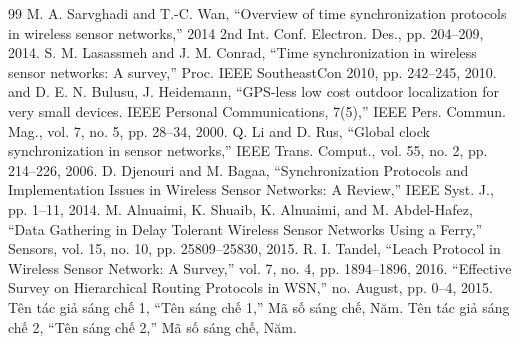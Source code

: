 \documentclass[12pt,a4paper]{report}
\begin{document}
\begin{thebibliography}{99}
     M. A. Sarvghadi and T.-C. Wan, ``Overview of time synchronization protocols in wireless sensor networks,'' 2014 2nd Int. Conf. Electron. Des., pp. 204–209, 2014.
     S. M. Lasassmeh and J. M. Conrad, ``Time synchronization in wireless sensor networks: A survey,'' Proc. IEEE SoutheastCon 2010, pp. 242–245, 2010.
     and D. E. N. Bulusu, J. Heidemann, ``GPS-less low cost outdoor localization for very small devices. IEEE Personal Communications, 7(5),'' IEEE Pers. Commun. Mag., vol. 7, no. 5, pp. 28–34, 2000.
     Q. Li and D. Rus, ``Global clock synchronization in sensor networks,'' IEEE Trans. Comput., vol. 55, no. 2, pp. 214–226, 2006.
     D. Djenouri and M. Bagaa, ``Synchronization Protocols and Implementation Issues in Wireless Sensor Networks: A Review,'' IEEE Syst. J., pp. 1–11, 2014.
     M. Alnuaimi, K. Shuaib, K. Alnuaimi, and M. Abdel-Hafez, ``Data Gathering in Delay Tolerant Wireless Sensor Networks Using a Ferry,'' Sensors, vol. 15, no. 10, pp. 25809–25830, 2015.
     R. I. Tandel, ``Leach Protocol in Wireless Sensor Network: A Survey,'' vol. 7, no. 4, pp. 1894–1896, 2016.
     ``Effective Survey on Hierarchical Routing Protocols in WSN,'' no. August, pp. 0–4, 2015.
     Tên tác giả sáng chế 1, ``Tên sáng chế 1,'' Mã số sáng chế, Năm.
     Tên tác giả sáng chế 2, ``Tên sáng chế 2,'' Mã số sáng chế, Năm.
\end{thebibliography}
\end{document}
